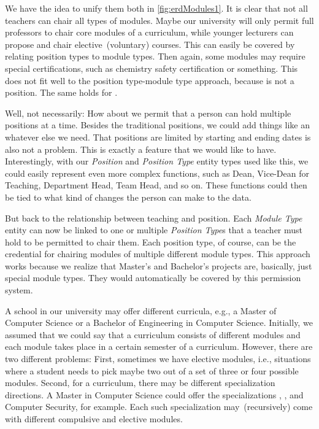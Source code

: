 We have the idea to unify them both in \cref{fig:erdModules1}.
It is clear that not all teachers can chair all types of modules.
Maybe our university will only permit full professors to chair core modules of a curriculum, while younger lecturers can propose and chair elective~(voluntary) courses.
This can easily be covered by relating position types to module types.
Then again, some modules may require special certifications, such as chemistry safety certification or something.
This does not fit well to the position type-module type approach, because  is not a position.
The same holds for .

Well, not necessarily:
How about we permit that a person can hold multiple positions at a time.
Besides the traditional positions, we could add things like   an whatever else we need.
That positions are limited by starting and ending dates is also not a problem.
This is exactly a feature that we would like to have.
Interestingly, with our \emph{Position} and \emph{Position Type} entity types used like this, we could easily represent even more complex functions, such as Dean, Vice-Dean for Teaching, Department Head, Team Head, and so on.
These functions could then be tied to what kind of changes the person can make to the data.

But back to the relationship between teaching and position.
Each \emph{Module Type} entity can now be linked to one or multiple \emph{Position Type}s that a teacher must hold to be permitted to chair them.
Each position type, of course, can be the credential for chairing modules of multiple different module types.
This approach works because we realize that Master's and Bachelor's projects are, basically, just special module types.
They would automatically be covered by this permission system.

A school in our university may offer different curricula, e.g., a Master of Computer Science or a Bachelor of Engineering in Computer Science.
Initially, we assumed that we could say that a curriculum consists of different modules and each module takes place in a certain semester of a curriculum.
However, there are two different problems:
First, sometimes we have elective modules, i.e., situations where a student needs to pick maybe two out of a set of three or four possible modules.
Second, for a curriculum, there may be different specialization directions.
A Master in Computer Science could offer the specializations , , and Computer Security, for example.
Each such specialization may~(recursively) come with different compulsive and elective modules.

